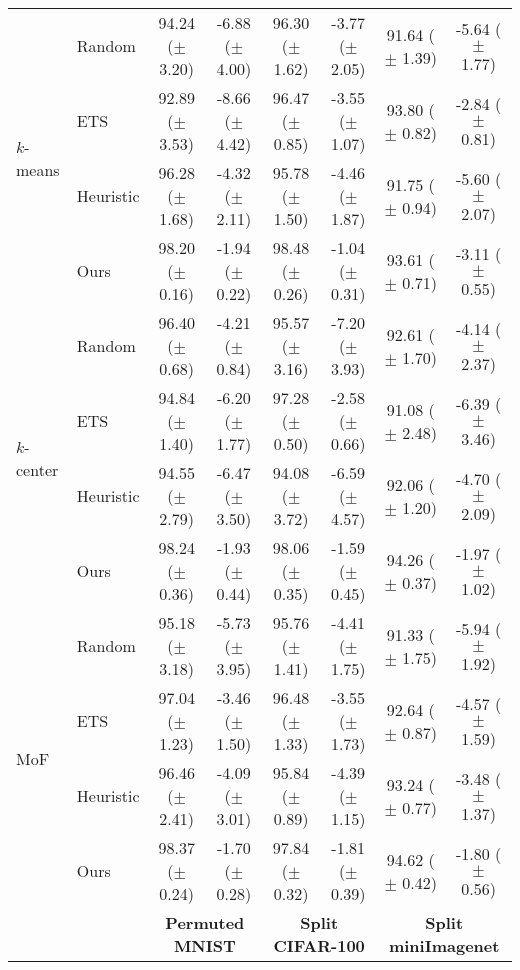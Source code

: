 \begin{table}[t]
{\begin{tabular}{l l c c c c c c}
        \midrule 
        \multirow{4}{*}{$k$-means} & Random & 94.24 ($\pm$ 3.20) & -6.88 ($\pm$ 4.00) & 96.30 ($\pm$ 1.62) & -3.77 ($\pm$ 2.05) & 91.64 ($\pm$ 1.39) & -5.64 ($\pm$ 1.77) \\
         & ETS & 92.89 ($\pm$ 3.53) & -8.66 ($\pm$ 4.42) & 96.47 ($\pm$ 0.85) & -3.55 ($\pm$ 1.07) & 93.80 ($\pm$ 0.82) & -2.84 ($\pm$ 0.81) \\
         & Heuristic & 96.28 ($\pm$ 1.68) & -4.32 ($\pm$ 2.11) & 95.78 ($\pm$ 1.50) & -4.46 ($\pm$ 1.87) & 91.75 ($\pm$ 0.94) & -5.60 ($\pm$ 2.07) \\
         & Ours & 98.20 ($\pm$ 0.16) & -1.94 ($\pm$ 0.22) & 98.48 ($\pm$ 0.26) & -1.04 ($\pm$ 0.31) & 93.61 ($\pm$ 0.71) & -3.11 ($\pm$ 0.55) \\
        \midrule 
        \multirow{4}{*}{$k$-center} & Random & 96.40 ($\pm$ 0.68) & -4.21 ($\pm$ 0.84) & 95.57 ($\pm$ 3.16) & -7.20 ($\pm$ 3.93) & 92.61 ($\pm$ 1.70) & -4.14 ($\pm$ 2.37) \\
         & ETS & 94.84 ($\pm$ 1.40) & -6.20 ($\pm$ 1.77) & 97.28 ($\pm$ 0.50) & -2.58 ($\pm$ 0.66) & 91.08 ($\pm$ 2.48) & -6.39 ($\pm$ 3.46) \\
         & Heuristic & 94.55 ($\pm$ 2.79) & -6.47 ($\pm$ 3.50) & 94.08 ($\pm$ 3.72) & -6.59 ($\pm$ 4.57) & 92.06 ($\pm$ 1.20) & -4.70 ($\pm$ 2.09) \\
         & Ours & 98.24 ($\pm$ 0.36) & -1.93 ($\pm$ 0.44) & 98.06 ($\pm$ 0.35) & -1.59 ($\pm$ 0.45) & 94.26 ($\pm$ 0.37) & -1.97 ($\pm$ 1.02) \\
        \midrule
        \multirow{4}{*}{MoF} & Random & 95.18 ($\pm$ 3.18) & -5.73 ($\pm$ 3.95) & 95.76 ($\pm$ 1.41) & -4.41 ($\pm$ 1.75) & 91.33 ($\pm$ 1.75) & -5.94 ($\pm$ 1.92) \\
         & ETS & 97.04 ($\pm$ 1.23) & -3.46 ($\pm$ 1.50) & 96.48 ($\pm$ 1.33) & -3.55 ($\pm$ 1.73) & 92.64 ($\pm$ 0.87) & -4.57 ($\pm$ 1.59) \\
         & Heuristic & 96.46 ($\pm$ 2.41) & -4.09 ($\pm$ 3.01) & 95.84 ($\pm$ 0.89) & -4.39 ($\pm$ 1.15) & 93.24 ($\pm$ 0.77) & -3.48 ($\pm$ 1.37) \\
         & Ours & 98.37 ($\pm$ 0.24) & -1.70 ($\pm$ 0.28) & 97.84 ($\pm$ 0.32) & -1.81 ($\pm$ 0.39) & 94.62 ($\pm$ 0.42) & -1.80 ($\pm$ 0.56) \\
        \bottomrule
        \toprule
         & & \multicolumn{2}{c}{{\bf Permuted MNIST} } & \multicolumn{2}{c}{{\bf Split CIFAR-100} } & \multicolumn{2}{c}{{\bf Split miniImagenet} } \\
         \cmidrule(lr){3-4} \cmidrule(lr){5-6} \cmidrule(lr){7-8} %

\end{tabular}}
\end{table}
